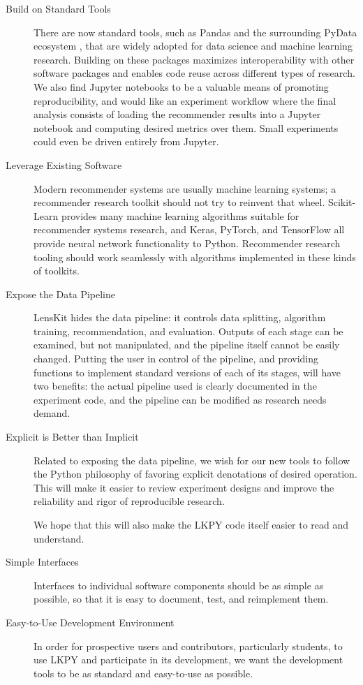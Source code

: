 \begin{description}
\item[Build on Standard Tools]
There are now standard tools, such as Pandas and the surrounding PyData ecosystem \citep{McKinney2018-pv}, that are widely adopted for data science and machine learning research.
Building on these packages maximizes interoperability with other software packages and enables code reuse across different types of research.
We also find Jupyter notebooks to be a valuable means of promoting reproducibility, and would like an experiment workflow where the final analysis consists of loading the recommender results into a Jupyter notebook and computing desired metrics over them.
Small experiments could even be driven entirely from Jupyter.

\item[Leverage Existing Software]
Modern recommender systems are usually machine learning systems; a recommender research toolkit should not try to reinvent that wheel.
Scikit-Learn provides many machine learning algorithms suitable for recommender systems research, and Keras, PyTorch, and TensorFlow all provide neural network functionality to Python.
Recommender research tooling should work seamlessly with algorithms implemented in these kinds of toolkits.

\item[Expose the Data Pipeline]
LensKit hides the data pipeline: it controls data splitting, algorithm training, recommendation, and evaluation.
Outputs of each stage can be examined, but not manipulated, and the pipeline itself cannot be easily changed.
Putting the user in control of the pipeline, and providing functions to implement standard versions of each of its stages, will have two benefits: the actual pipeline used is clearly documented in the experiment code, and the pipeline can be modified as research needs demand.

\item[Explicit is Better than Implicit]
Related to exposing the data pipeline, we wish for our new tools to follow the Python philosophy of favoring explicit denotations of desired operation.
This will make it easier to review experiment designs and improve the reliability and rigor of reproducible research.

We hope that this will also make the LKPY code itself easier to read and understand.

\item[Simple Interfaces]
Interfaces to individual software components should be as simple as possible, so that it is easy to document, test, and reimplement them.

\item[Easy-to-Use Development Environment]
In order for prospective users and contributors, particularly students, to use LKPY and participate in its development, we want the development tools to be as standard and easy-to-use as possible.
\end{description}

